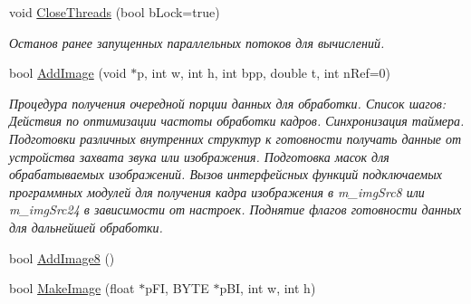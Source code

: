 \begin{DoxyCompactItemize}
void \hyperlink{class_c_v_i_engine_base_a0905eba46bb64f25a2d91f8b39a3f994}{Close\+Threads} (bool b\+Lock=true)
\begin{DoxyCompactList}\small\item\em Останов ранее запущенных параллельных потоков для вычислений. \end{DoxyCompactList}\item 
bool \hyperlink{class_c_v_i_engine_base_ac886baeaf14b16970d089edaf6767a79}{Add\+Image} (void $\ast$p, int w, int h, int bpp, double t, int n\+Ref=0)
\begin{DoxyCompactList}\small\item\em Процедура получения очередной порции данных для обработки. Список шагов\+: Действия по оптимизации частоты обработки кадров. Синхронизация таймера. Подготовки различных внутренних структур к готовности получать данные от устройства захвата звука или изображения. Подготовка масок для обрабатываемых изображений. Вызов интерфейсных функций подключаемых программных модулей для получения кадра изображения в m\+\_\+img\+Src8 или m\+\_\+img\+Src24 в зависимости от настроек. Поднятие флагов готовности данных для дальнейшей обработки. \end{DoxyCompactList}\item 
bool \hyperlink{class_c_v_i_engine_base_a3fe6ae4f9ac6b9422c22d99878f424f5}{Add\+Image8} ()
\item 
bool \hyperlink{class_c_v_i_engine_base_a3426944a03bac2f5a8c135c217f9cf8c}{Make\+Image} (float $\ast$p\+F\+I, B\+Y\+T\+E $\ast$p\+B\+I, int w, int h)

\end{DoxyCompactItemize}
